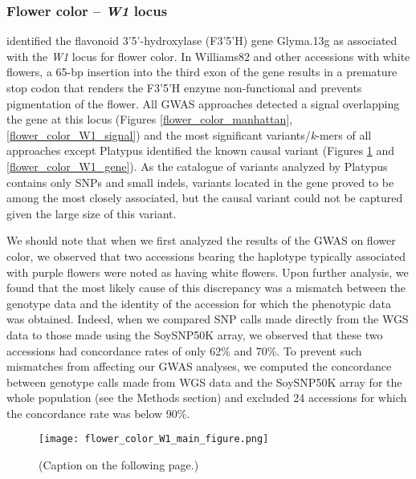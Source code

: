 \subsubsection*{Flower color -- \textit{W1} locus}
\label{sv-gwas-main-results-flower-color-l1}

\cite{zabala2007} identified the flavonoid 3’5’-hydroxylase (F3’5’H) gene
Glyma.13g as associated with the \textit{W1} locus for flower color. In
Williams82 and other accessions with white flowers, a 65-bp insertion into the
third exon of the gene results in a premature stop codon that renders the
F3’5’H enzyme non-functional and prevents pigmentation of the flower. All
GWAS approaches detected a signal overlapping the gene at this locus (Figures
\ref{flower_color_manhattan}, \ref{flower_color_W1_signal}) and the most
significant variants/\textit{k}-mers of all approaches except Platypus identified
the known causal variant (Figures \ref{flower-color-main-figure} and
\ref{flower_color_W1_gene}).
As the catalogue of variants analyzed by Platypus contains only SNPs and small
indels, variants located in the gene proved to be among the most closely
associated, but the causal variant could not be captured given the large size
of this variant.

We should note that when we first analyzed the results of the GWAS on flower
color, we observed that two accessions bearing the haplotype typically
associated with purple flowers were noted as having white flowers. Upon further
analysis, we found that the most likely cause of this discrepancy was a
mismatch between the genotype data and the identity of the accession for which
the phenotypic data was obtained. Indeed, when we compared SNP calls made
directly from the WGS data to those made using the SoySNP50K array, we observed
that these two accessions had concordance rates of only 62\% and 70\%. To
prevent such mismatches from affecting our GWAS analyses, we computed the
concordance between genotype calls made from WGS data and the SoySNP50K array
for the whole population (see the Methods section) and
excluded 24 accessions for which the concordance rate was below 90\%.

\begin{figure}
	\centering
	\texttt{[image: flower\_color\_W1\_main\_figure.png]}
	\caption[Results of SV- and \textit{k}-mer-based GWAS at the
	\textit{W1} locus for flower color]{(Caption on the following page.)}
	\label{flower-color-main-figure}
\end{figure}

